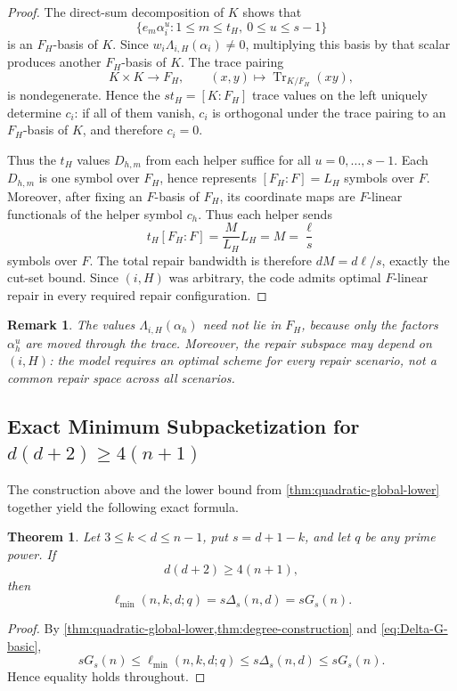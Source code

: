 \documentclass[11pt,onecolumn]{IEEEtran}
\newtheorem{theorem}{Theorem}
\newtheorem{remark}{Remark}
\newcommand{\Tr}{\operatorname{Tr}}
\newcommand{\ellmin}{\ell_{\min}}
\begin{document}
\begin{proof}
The direct-sum decomposition of $K$ shows that
\[
\{e_m\alpha_i^u:1\le m\le t_H,\ 0\le u\le s-1\}
\]
is an $F_H$-basis of $K$.  Since
$w_i\Lambda_{i,H}(\alpha_i)\ne0$, multiplying this basis by that scalar
produces another $F_H$-basis of $K$.  The trace pairing
\[
K\times K\longrightarrow F_H,
\qquad
(x,y)\longmapsto\Tr_{K/F_H}(xy),
\]
is nondegenerate.  Hence the $st_H=[K:F_H]$ trace values on the left uniquely determine
$c_i$: if all of them vanish, $c_i$ is orthogonal under the trace
pairing to an $F_H$-basis of $K$, and therefore $c_i=0$.

Thus the $t_H$ values $D_{h,m}$ from each helper suffice
for all $u=0,\ldots,s-1$. Each $D_{h,m}$ is one symbol
over $F_H$, hence represents
$[F_H:F]=L_H$ symbols over $F$.  Moreover, after fixing an $F$-basis
of $F_H$, its coordinate maps are $F$-linear functionals of the helper
symbol $c_h$.  Thus each helper sends
\[
t_H[F_H:F]
=\frac{M}{L_H}L_H
=M
=\frac{\ell}{s}
\]
symbols over $F$.  The total repair bandwidth is therefore
$dM=d\ell/s$, exactly the cut-set bound. Since $(i,H)$ was
arbitrary, the code admits optimal $F$-linear repair in every
required repair configuration.
\end{proof}

\begin{remark}
The values $\Lambda_{i,H}(\alpha_h)$ need not lie in $F_H$, because only
the factors $\alpha_h^u$ are moved through the trace.  Moreover, the
repair subspace may depend on $(i,H)$: the model requires an optimal
scheme for every repair scenario, not a common repair space across all
scenarios.
\end{remark}

\subsection{Exact Minimum Subpacketization for
\texorpdfstring{$d(d+2)\geq 4(n+1)$}{d(d+2) >= 4(n+1)}}

The construction above and the lower bound from
\cref{thm:quadratic-global-lower} together yield the following exact formula.

\begin{theorem}
\label{thm:minimum-exact}
Let $3\le k<d\le n-1$, put $s=d+1-k$, and let $q$ be any prime
power.  If
\[
 d(d+2)\geq 4(n+1),
\]
then
\[
 \ellmin(n,k,d;q)=s\Delta_s(n,d)=sG_s(n).
\]
\end{theorem}

\begin{proof}
By \cref{thm:quadratic-global-lower,thm:degree-construction} and
\eqref{eq:Delta-G-basic},
\[
 sG_s(n)
 \le \ellmin(n,k,d;q)
 \le s\Delta_s(n,d)
 \le sG_s(n).
\]
Hence equality holds throughout.
\end{proof}
\end{document}
